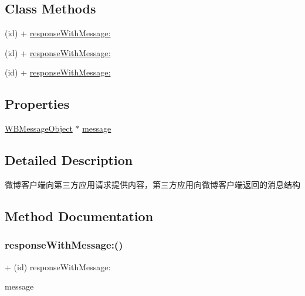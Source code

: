 \subsection*{Class Methods}
\begin{DoxyCompactItemize}
\item 
(id) + \mbox{\hyperlink{interface_w_b_provide_message_for_weibo_response_afa9a83935ca374cd240bbe6194b6d0b0}{response\+With\+Message\+:}}
\item 
(id) + \mbox{\hyperlink{interface_w_b_provide_message_for_weibo_response_afa9a83935ca374cd240bbe6194b6d0b0}{response\+With\+Message\+:}}
\item 
(id) + \mbox{\hyperlink{interface_w_b_provide_message_for_weibo_response_afa9a83935ca374cd240bbe6194b6d0b0}{response\+With\+Message\+:}}
\end{DoxyCompactItemize}
\subsection*{Properties}
\begin{DoxyCompactItemize}
\item 
\mbox{\hyperlink{interface_w_b_message_object}{W\+B\+Message\+Object}} $\ast$ \mbox{\hyperlink{interface_w_b_provide_message_for_weibo_response_af7341f4a118855d17956ae6629217c26}{message}}
\end{DoxyCompactItemize}


\subsection{Detailed Description}
微博客户端向第三方应用请求提供内容，第三方应用向微博客户端返回的消息结构 

\subsection{Method Documentation}
\mbox{\label{interface_w_b_provide_message_for_weibo_response_afa9a83935ca374cd240bbe6194b6d0b0}} 
\subsubsection{\texorpdfstring{response\+With\+Message\+:()}{responseWithMessage:()}\hspace{0.1cm}{\footnotesize\ttfamily [1/3]}}
{\footnotesize\ttfamily + (id) response\+With\+Message\+: \begin{DoxyParamCaption}\item[{(\mbox{\hyperlink{interface_w_b_message_object}{W\+B\+Message\+Object}} $\ast$)}]{message }\end{DoxyParamCaption}}

